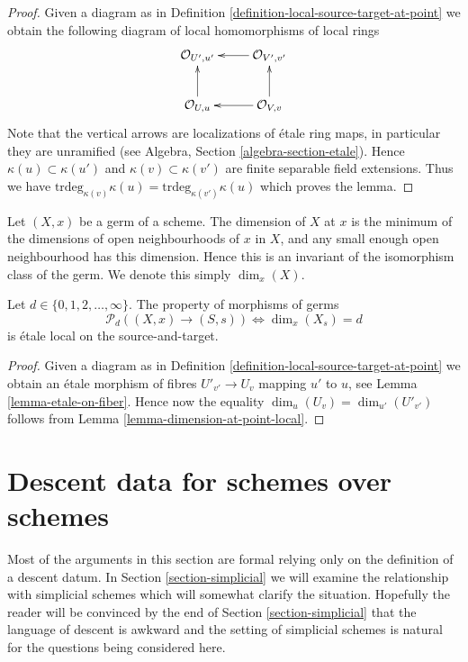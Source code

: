 \begin{proof}
Given a diagram as in
Definition \ref{definition-local-source-target-at-point}
we obtain the following diagram of local homomorphisms of local rings
$$
\xymatrix{
\mathcal{O}_{U', u'} & \mathcal{O}_{V', v'} \ar[l] \\
\mathcal{O}_{U, u} \ar[u] & \mathcal{O}_{V, v} \ar[l] \ar[u]
}
$$
Note that the vertical arrows are localizations of \'etale ring maps,
in particular they are unramified (see
Algebra, Section \ref{algebra-section-etale}).
Hence $\kappa(u) \subset \kappa(u')$ and $\kappa(v) \subset \kappa(v')$
are finite separable field extensions.
Thus we have
$\text{trdeg}_{\kappa(v)} \kappa(u) = \text{trdeg}_{\kappa(v')} \kappa(u)$
which proves the lemma.
\end{proof}

\noindent
Let $(X, x)$ be a germ of a scheme.
The dimension of $X$ at $x$ is the minimum of the dimensions of
open neighbourhoods of $x$ in $X$, and any small enough open neighbourhood
has this dimension. Hence this is an invariant of the isomorphism class
of the germ. We denote this simply $\dim_x(X)$.

\begin{lemma}
\label{lemma-dimension-at-point}
Let $d \in \{0, 1, 2, \ldots, \infty\}$.
The property of morphisms of germs
$$
\mathcal{P}_d((X, x) \to (S, s))
\Leftrightarrow
\dim_x (X_s) = d
$$
is \'etale local on the source-and-target.
\end{lemma}

\begin{proof}
Given a diagram as in
Definition \ref{definition-local-source-target-at-point}
we obtain an \'etale morphism of fibres
$U'_{v'} \to U_v$ mapping $u'$ to $u$, see
Lemma \ref{lemma-etale-on-fiber}.
Hence now the equality $\dim_u(U_v) = \dim_{u'}(U'_{v'})$ follows from
Lemma \ref{lemma-dimension-at-point-local}.
\end{proof}







\section{Descent data for schemes over schemes}
\label{section-descent-datum}

\noindent
Most of the arguments in this section are formal relying only
on the definition of a descent datum. In Section \ref{section-simplicial}
we will examine the relationship with simplicial schemes which will
somewhat clarify the situation. Hopefully the reader will be convinced
by the end of Section \ref{section-simplicial} that the language of descent
is awkward and the setting of simplicial schemes is natural for the
questions being considered here.

